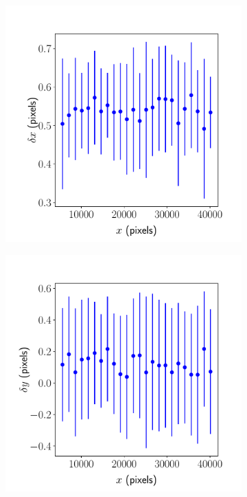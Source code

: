 \documentclass{article}
\begin{document}
\begin{figure}[ht]
	\centering
	\begin{subfigure}{0.24\linewidth}
		\includegraphics[width=\linewidth]{sine-wave-2-xx-AKY.pdf}
		\caption{}
		\label{fig:sinewave2xxAKY}
	\end{subfigure}
	\begin{subfigure}{0.24\linewidth}
		\includegraphics[width=\linewidth]{sine-wave-2-yx-AKY.pdf}

\end{subfigure}
\end{figure}
\end{document}
